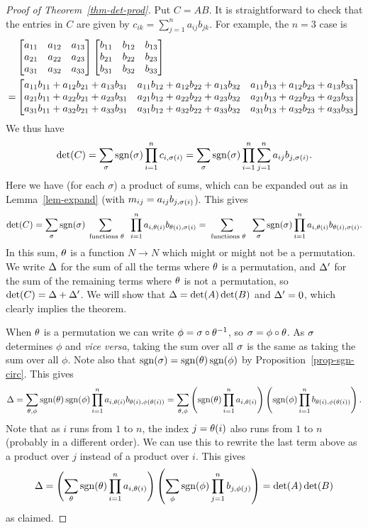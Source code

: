 \documentclass[reqno]{amsart}
\theoremstyle{definition}
\begin{document}
\begin{proof}[Proof of Theorem~\ref{thm-det-prod}]
 Put $C=AB$.  It is straightforward to check that the entries in $C$ are
 given by $c_{ik}=\sum_{j=1}^na_{ij}b_{jk}$.  For example, the $n=3$
 case is
 \begin{align*}
    & \left[\begin{matrix}
     a_{11}&a_{12}&a_{13} \\ a_{21}&a_{22}&a_{23} \\ a_{31}&a_{32}&a_{33}
    \end{matrix}\right]
    \left[\begin{matrix}
     b_{11}&b_{12}&b_{13} \\ b_{21}&b_{22}&b_{23} \\ b_{31}&b_{32}&b_{33}
    \end{matrix}\right] \\
    =
    & \left[\begin{matrix}
     a_{11}b_{11} + a_{12}b_{21} + a_{13}b_{31} &
     a_{11}b_{12} + a_{12}b_{22} + a_{13}b_{32} &
     a_{11}b_{13} + a_{12}b_{23} + a_{13}b_{33} \\
     a_{21}b_{11} + a_{22}b_{21} + a_{23}b_{31} &
     a_{21}b_{12} + a_{22}b_{22} + a_{23}b_{32} &
     a_{21}b_{13} + a_{22}b_{23} + a_{23}b_{33} \\
     a_{31}b_{11} + a_{32}b_{21} + a_{33}b_{31} &
     a_{31}b_{12} + a_{32}b_{22} + a_{33}b_{32} &
     a_{31}b_{13} + a_{32}b_{23} + a_{33}b_{33}
    \end{matrix}\right]
 \end{align*}
 We thus have
 \[ \det(C) =
     \sum_\sigma \operatorname{sgn}(\sigma)\prod_{i=1}^n c_{i,\sigma(i)} =
     \sum_\sigma \operatorname{sgn}(\sigma)\prod_{i=1}^n \sum_{j=1}^n a_{ij}b_{j,\sigma(i)}.
 \]
 Here we have (for each $\sigma$) a product of sums,
 which can be expanded out as in
 Lemma~\ref{lem-expand} (with $m_{ij}=a_{ij}b_{j,\sigma(i)}$).  This
 gives
 \[ \det(C) =
     \sum_\sigma \operatorname{sgn}(\sigma) \sum_{\text{ functions } \theta} \; \; \prod_{i=1}^n a_{i,\theta(i)}b_{\theta(i),\sigma(i)}
     =
     \sum_{\text{ functions } \theta} \; \; \sum_\sigma \operatorname{sgn}(\sigma)\prod_{i=1}^n a_{i,\theta(i)}b_{\theta(i),\sigma(i)}.
 \]
 In this sum, $\theta$ is a function $N\to N$ which might or might not
 be a permutation.  We write $\Delta$ for the sum of all the terms where
 $\theta$ is a permutation, and $\Delta'$ for the sum of the remaining
 terms where $\theta$ is not a permutation, so $\det(C)=\Delta+\Delta'$.  We
 will show that $\Delta=\det(A)\det(B)$ and $\Delta'=0$, which clearly
 implies the theorem.

 When $\theta$ is a permutation we can write $\phi=\sigma\circ\theta^{-1}$,
 so $\sigma=\phi\circ\theta$.  As $\sigma$ determines $\phi$ and \emph{vice
  versa}, taking the sum over all $\sigma$ is the same as taking the sum
 over all $\phi$.  Note also that $\operatorname{sgn}(\sigma)=\operatorname{sgn}(\theta)\operatorname{sgn}(\phi)$ by
 Proposition~\ref{prop-sgn-circ}.  This gives
 \[ \Delta = \sum_{\theta,\phi}
           \operatorname{sgn}(\theta)\operatorname{sgn}(\phi)
            \prod_{i=1}^n a_{i,\theta(i)}b_{\theta(i),\phi(\theta(i))}
        = \sum_{\theta,\phi}
           \left(\operatorname{sgn}(\theta)\prod_{i=1}^na_{i,\theta(i)}\right)
           \left(\operatorname{sgn}(\phi)\prod_{i=1}^nb_{\theta(i),\phi(\theta(i))}\right).
 \]
 Note that as $i$ runs from $1$ to $n$, the index $j=\theta(i)$ also
 runs from $1$ to $n$ (probably in a different order).  We can use
 this to rewrite the last term above as a product over $j$ instead of
 a product over $i$.  This gives
 \[ \Delta =  \left(\sum_\theta\operatorname{sgn}(\theta)\prod_{i=1}^na_{i,\theta(i)}\right)
           \left(\sum_\phi\operatorname{sgn}(\phi)\prod_{j=1}^nb_{j,\phi(j)}\right)
        = \det(A)\det(B)
 \]
 as claimed.


\end{proof}
\end{document}
